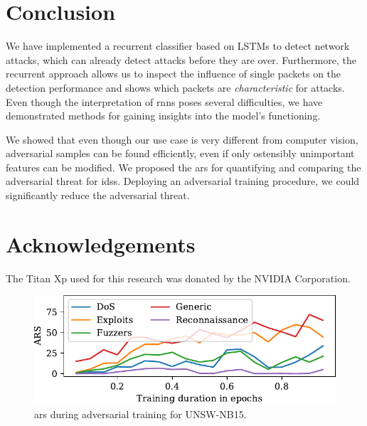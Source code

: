 \documentclass[conference]{IEEEtran}
\begin{document}
\section{Conclusion}

We have implemented a recurrent classifier based on LSTMs to detect network attacks, %
which can already detect attacks before they are over. Furthermore, the recurrent approach allows us to inspect the influence of single packets on the detection performance and shows which packets are \textit{characteristic} for attacks.
Even though the interpretation of \glspl{rnn} poses several difficulties, we have demonstrated methods for gaining insights into the model's functioning.

We showed that even though our use case is very different from computer vision, adversarial samples can be found efficiently, even if only ostensibly unimportant features can be modified. We proposed the \gls{ars} for quantifying and comparing the adversarial threat for \glspl{ids}.
Deploying an adversarial training procedure, we could significantly reduce the adversarial threat.

\section*{Acknowledgements}
The Titan Xp used for this research was donated by the NVIDIA Corporation.


\begin{figure}
\centering
\includegraphics[width=0.98\columnwidth]{../plots/ars/ars_15.pdf}
\caption{\gls{ars} during adversarial training for UNSW-NB15.}
\label{fig:avdistance}
\end{figure}

\renewcommand*{\bibfont}{\small}


\end{document}
